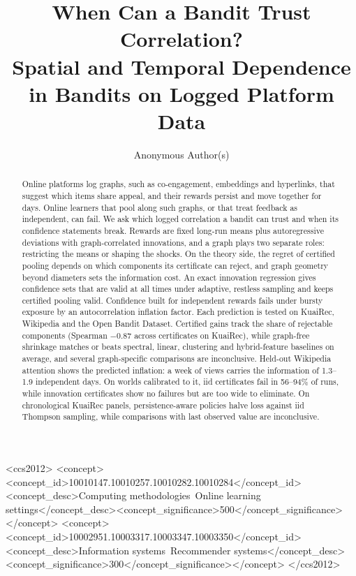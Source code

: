 \documentclass[sigconf,review,anonymous]{acmart}
\begin{document}
\title{When Can a Bandit Trust Correlation?\texorpdfstring{\\}{ }Spatial and Temporal Dependence in Bandits on Logged Platform Data}

\author{Anonymous Author(s)}

\begin{abstract}
Online platforms log graphs, such as co-engagement, embeddings and hyperlinks, that suggest which items share appeal, and their rewards persist and move together for days. Online learners that pool along such graphs, or that treat feedback as independent, can fail. We ask which logged correlation a bandit can trust and when its confidence statements break. Rewards are fixed long-run means plus autoregressive deviations with graph-correlated innovations, and a graph plays two separate roles: restricting the means or shaping the shocks. On the theory side, the regret of certified pooling depends on which components its certificate can reject, and graph geometry beyond diameters sets the information cost. An exact innovation regression gives confidence sets that are valid at all times under adaptive, restless sampling and keeps certified pooling valid. Confidence built for independent rewards fails under bursty exposure by an autocorrelation inflation factor. Each prediction is tested on KuaiRec, Wikipedia and the Open Bandit Dataset. Certified gains track the share of rejectable components (Spearman $-0.87$ across certificates on KuaiRec), while graph-free shrinkage matches or beats spectral, linear, clustering and hybrid-feature baselines on average, and several graph-specific comparisons are inconclusive. Held-out Wikipedia attention shows the predicted inflation: a week of views carries the information of 1.3--1.9 independent days. On worlds calibrated to it, iid certificates fail in 56--94\% of runs, while innovation certificates show no failures but are too wide to eliminate. On chronological KuaiRec panels, persistence-aware policies halve loss against iid Thompson sampling, while comparisons with last observed value are inconclusive.
\end{abstract}

\begin{CCSXML}
<ccs2012>
<concept><concept_id>10010147.10010257.10010282.10010284</concept_id>
<concept_desc>Computing methodologies~Online learning settings</concept_desc><concept_significance>500</concept_significance></concept>
<concept><concept_id>10002951.10003317.10003347.10003350</concept_id>
<concept_desc>Information systems~Recommender systems</concept_desc><concept_significance>300</concept_significance></concept>
</ccs2012>
\end{CCSXML}
\end{document}
